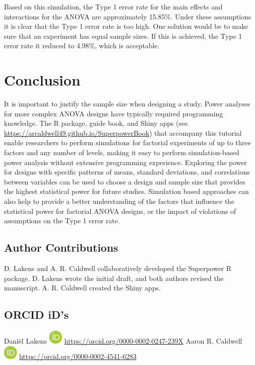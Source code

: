 \documentclass[
  ,jou,floatsintext]{apa6}
\begin{document}
Based on this simulation, the Type 1 error rate for the main effects and interactions for the ANOVA are approximately 15.85\%.
Under these assumptions it is clear that the Type 1 error rate is too high.
One solution would be to make sure that an experiment has equal sample sizes.
If this is achieved, the Type 1 error rate it reduced to 4.98\%, which is acceptable.

\hypertarget{conclusion}{%
\section{Conclusion}\label{conclusion}}

It is important to justify the sample size when designing a study.
Power analyses for more complex ANOVA designs have typically required programming knowledge.
The R package, guide book, and Shiny apps (see \url{https://arcaldwell49.github.io/SuperpowerBook}) that accompany this tutorial enable researchers to perform simulations for factorial experiments of up to three factors and any number of levels, making it easy to perform simulation-based power analysis without extensive programming experience.
Exploring the power for designs with specific patterns of means, standard deviations, and correlations between variables can be used to choose a design and sample size that provides the highest statistical power for future studies.
Simulation based approaches can also help to provide a better understanding of the factors that influence the statistical power for factorial ANOVA designs, or the impact of violations of assumptions on the Type 1 error rate.

\hypertarget{author-contributions}{%
\subsection{Author Contributions}\label{author-contributions}}

D. Lakens and A. R. Caldwell collaboratively developed the Superpower R package. D. Lakens wrote the initial draft, and both authors revised the manuscript. A. R. Caldwell created the Shiny apps.

\hypertarget{orcid-ids}{%
\subsection{ORCID iD's}\label{orcid-ids}}

Daniël Lakens \includegraphics{screenshots/orcid.png} \url{https://orcid.org/0000-0002-0247-239X}
Aaron R. Caldwell \includegraphics{screenshots/orcid.png} \url{https://orcid.org/0000-0002-4541-6283}
\end{document}

